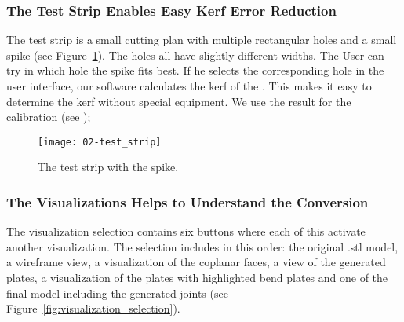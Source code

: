 \documentclass[../ClassicThesis.tex]{subfiles}
\begin{document}
\subsubsection{The Test Strip Enables Easy Kerf Error Reduction}
\label{sec:test_strip}


The test strip is a small cutting plan with multiple rectangular holes and a small spike (see Figure~\ref{fig:test_strip}). The holes all have slightly different widths. The User can try in which hole the spike fits best. If he selects the corresponding hole in the user interface, our software calculates the kerf of the \lasercutter . This  makes it easy to determine the kerf without special equipment. We use the result for the calibration (see );

\begin{figure}
  \centering
  \texttt{[image: 02-test\_strip]}
  \caption{The test strip with the spike.}
  \label{fig:test_strip}
\end{figure}

\subsubsection{The Visualizations Helps to Understand the Conversion}

The visualization selection contains six buttons where each of this activate another visualization. The selection includes in this order: the original .stl model, a wireframe view, a visualization of the coplanar faces, a view of the generated plates, a visualization of the plates with highlighted bend plates and one of the final model including the generated joints (see Figure~\ref{fig:visualization_selection}).
\end{document}
